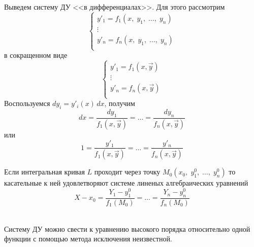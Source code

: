 \begin{Note}
    Выведем систему ДУ <<в дифференциалах>>. Для этого рассмотрим
    \[
        \begin{cases}
            y'_1 = f_1(x,\; y_1,\; \dots,\; y_n)\\
            \vdots\\
            y'_n = f_n(x,\; y_1,\; \dots,\; y_n)\\
        \end{cases}
    \]
    в сокращенном виде
    \[
        \begin{cases}
            y'_1 = f_1(x, \vec{y})\\
            \vdots\\
            y'_n = f_n(x, \vec{y})\\
        \end{cases}
    \]
    Воспользуемся $dy_i = y'_i(x)\,dx$, получим
    \[
        dx = \frac{dy_1}{f_1(x, \vec{y})} = \dots = \frac{dy_n}{f_n(x, \vec{y})}
    \]
    или
    \[
        1 = \frac{y'_1}{f_1(x, \vec{y})} = \dots =  \frac{y'_n}{f_n(x, \vec{y})}
    \]
    
    Если интегральная кривая $L$ проходит через точку $M_0(x_0,\; y^0_1,\; \dots,\; y^0_n)$ то касательные к ней удовлетворяют системе линеных алгебраических уравнений
    \[
        X - x_0 = \frac{Y_1 - y^0_1}{f_1(M_0)} = \dots = \frac{Y_n - y^0_n}{f_n(M_0)}
    \]
\end{Note}

\begin{Note}~\\
    Систему ДУ можно свести к уравнению высокого порядка относительно одной функции с помощью метода исключения неизвестной.
\end{Note}

